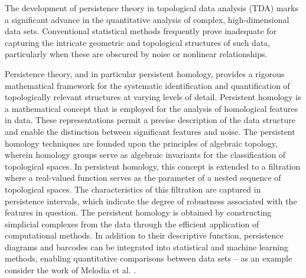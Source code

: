 The development of persistence theory in topological data analysis (TDA) marks a significant advance in the quantitative analysis of complex, high-dimensional data sets. Conventional statistical methods frequently prove inadequate for capturing the intricate geometric and topological structures of such data, particularly when these are obscured by noise or nonlinear relationships.

Persistence theory, and in particular persistent homology, provides a rigorous mathematical framework for the systematic identification and quantification of topologically relevant structures at varying levels of detail. Persistent homology is a mathematical concept that is employed for the analysis of homological features in data. These representations permit a precise description of the data structure and enable the distinction between significant features and noise. The persistent homology techniques are founded upon the principles of algebraic topology, wherein homology groups serve as algebraic invariants for the classification of topological spaces. In persistent homology, this concept is extended to a filtration where a real-valued function serves as the parameter of a nested sequence of topological spaces. The characteristics of this filtration are captured in persistence intervals, which indicate the degree of robustness associated with the features in question. The persistent homology is obtained by constructing simplicial complexes from the data through the efficient application of computational methods. In addition to their descriptive function, persistence diagrams and barcodes can be integrated into statistical and machine learning methods, enabling quantitative comparisons between data sets -- as an example consider the work of Melodia et al. \cite{melodia2018deep,melodia2020persistent,melodia2021estimate,melodia2021homological}.

